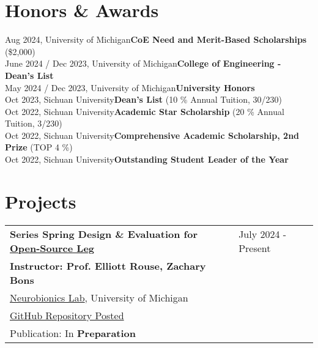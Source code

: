 \documentclass[letter,12pt]{article}
\begin{document}
\section{Honors \& Awards}

\small
{
    Aug 2024, University of Michigan\hfill \textbf{CoE Need and Merit-Based Scholarships} (\$2,000)\\
    June 2024 / Dec 2023, University of Michigan\hfill \textbf{College of Engineering - Dean's List}\\
    May 2024 / Dec 2023, University of Michigan\hfill \textbf{University Honors}\\
    Oct 2023, Sichuan University\hfill \textbf{Dean's List} (10 \% Annual Tuition, 30/230)\\
    Oct 2022, Sichuan University\hfill \textbf{Academic Star Scholarship} (20 \% Annual Tuition, 3/230)\\
    Oct 2022, Sichuan University\hfill \textbf{Comprehensive Academic Scholarship, 2nd Prize} (TOP 4 \%)\\
    Oct 2022, Sichuan University\hfill \textbf{Outstanding Student Leader of the Year}\\
}



\section{Projects}

\begin{tabularx}{\linewidth}{@{}l X@{}}
    \large \textbf{Series Spring Design \& Evaluation for \href{https://www.opensourceleg.org/about}{Open-Source Leg}} & \hfill July 2024 - Present \\
    \small{\textbf{Instructor: Prof. Elliott Rouse, Zachary Bons}} & \hfill {} \\
    \small{\href{https://neurobionics.robotics.umich.edu/}{Neurobionics Lab}, University of Michigan} & \hfill {} \\
    \small{\href{https://github.com/Robin0265/OSL_Spring_TestBed}{GitHub Repository Posted}} & \hfill {} \\
    \small{Publication: In \textbf{Preparation}} & \hfill {} \\
    \end{tabularx}
\end{document}
